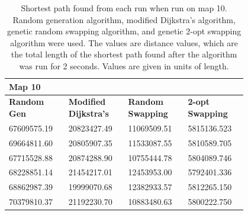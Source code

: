 \documentclass{article}
\begin{document}
\begin{appendices}
\begin{table}[H]
    \caption{Shortest path found from each run when run on map 10. Random generation algorithm, modified Dijkstra's algorithm, genetic random swapping algorithm, and genetic 2-opt swapping algorithm were used. The values are distance values, which are the total length of the shortest path found after the algorithm was run for 2 seconds. Values are given in units of length.}
    \centering
    \begin{tabular}{|p{0.2\linewidth}|p{0.2\linewidth}|p{0.2\linewidth}|p{0.2\linewidth}|}
    \hline
        \textbf{Map 10} & ~ & ~ & ~ \\ \hline
        \textbf{Random Gen} & \textbf{Modified Dijkstra's} & \textbf{Random Swapping} & \textbf{2-opt Swapping} \\ \hline
        67609575.19 & 20823427.49 & 11069509.51 & 5815136.523 \\ \hline
        69664811.60 & 20805907.35 & 11533087.55 & 5810589.705 \\ \hline
        67715528.88 & 20874288.90 & 10755444.78 & 5804089.746 \\ \hline
        68228851.14 & 21454217.01 & 12453953.00 & 5792401.336 \\ \hline
        68862987.39 & 19999070.68 & 12382933.57 & 5812265.150 \\ \hline
        70379810.37 & 21192230.70 & 10883480.63 & 5800222.750 \\ \hline
    \end{tabular}
\end{table}














\end{appendices}
\end{document}
